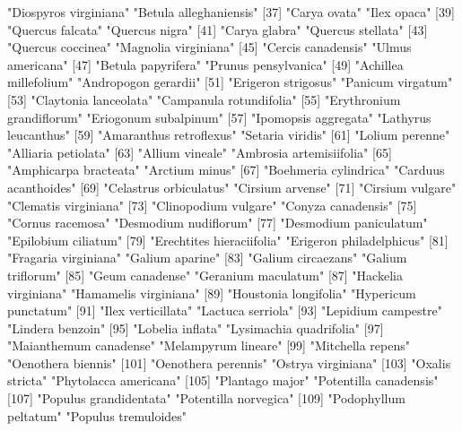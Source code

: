\documentclass{article}
\begin{document}
\begin{Schunk}
\begin{Soutput}
 [35] "Diospyros virginiana"          "Betula alleghaniensis"        
 [37] "Carya ovata"                   "Ilex opaca"                   
 [39] "Quercus falcata"               "Quercus nigra"                
 [41] "Carya glabra"                  "Quercus stellata"             
 [43] "Quercus coccinea"              "Magnolia virginiana"          
 [45] "Cercis canadensis"             "Ulmus americana"              
 [47] "Betula papyrifera"             "Prunus pensylvanica"          
 [49] "Achillea millefolium"          "Andropogon gerardii"          
 [51] "Erigeron strigosus"            "Panicum virgatum"             
 [53] "Claytonia lanceolata"          "Campanula rotundifolia"       
 [55] "Erythronium grandiflorum"      "Eriogonum subalpinum"         
 [57] "Ipomopsis aggregata"           "Lathyrus leucanthus"          
 [59] "Amaranthus retroflexus"        "Setaria viridis"              
 [61] "Lolium perenne"                "Alliaria petiolata"           
 [63] "Allium vineale"                "Ambrosia artemisiifolia"      
 [65] "Amphicarpa bracteata"          "Arctium minus"                
 [67] "Boehmeria cylindrica"          "Carduus acanthoides"          
 [69] "Celastrus orbiculatus"         "Cirsium arvense"              
 [71] "Cirsium vulgare"               "Clematis virginiana"          
 [73] "Clinopodium vulgare"           "Conyza canadensis"            
 [75] "Cornus racemosa"               "Desmodium nudiflorum"         
 [77] "Desmodium paniculatum"         "Epilobium ciliatum"           
 [79] "Erechtites hieraciifolia"      "Erigeron philadelphicus"      
 [81] "Fragaria virginiana"           "Galium aparine"               
 [83] "Galium circaezans"             "Galium triflorum"             
 [85] "Geum canadense"                "Geranium maculatum"           
 [87] "Hackelia virginiana"           "Hamamelis virginiana"         
 [89] "Houstonia longifolia"          "Hypericum punctatum"          
 [91] "Ilex verticillata"             "Lactuca serriola"             
 [93] "Lepidium campestre"            "Lindera benzoin"              
 [95] "Lobelia inflata"               "Lysimachia quadrifolia"       
 [97] "Maianthemum canadense"         "Melampyrum lineare"           
 [99] "Mitchella repens"              "Oenothera biennis"            
[101] "Oenothera perennis"            "Ostrya virginiana"            
[103] "Oxalis stricta"                "Phytolacca americana"         
[105] "Plantago major"                "Potentilla canadensis"        
[107] "Populus grandidentata"         "Potentilla norvegica"         
[109] "Podophyllum peltatum"          "Populus tremuloides"          

\end{Soutput}
\end{Schunk}
\end{document}
